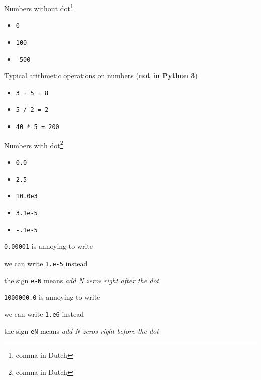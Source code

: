 \documentclass{beamer}
\begin{document}
\begin{slide}{
\item Numbers without dot\footnote{comma in Dutch}
\begin{itemize}
\item \texttt{0}
\item \texttt{100} 
\item \texttt{-500}
\end{itemize}
}\end{slide}

\begin{slide}{
\item Typical arithmetic operations on numbers (\textbf{not in Python 3})
\begin{itemize}
\item \texttt{3 + 5 = 8}
\item \texttt{5 / 2 = 2}
\item \texttt{40 * 5 = 200}
\end{itemize} 
}\end{slide}

\begin{slide}{
\item Numbers with dot\footnote{comma in Dutch}
\begin{itemize}
\item \texttt{0.0}
\item \texttt{2.5}
\item \texttt{10.0e3}
\item \texttt{3.1e-5}
\item \texttt{-.1e-5}
\end{itemize}
}\end{slide}

\begin{slide}{
\item \texttt{0.00001} is annoying to write
\item we can write \texttt{1.e-5} instead
\item the sign \texttt{e-N} means \textit{add N zeros right after the dot}
}\end{slide}

\begin{slide}{
\item \texttt{1000000.0} is annoying to write
\item we can write \texttt{1.e6} instead
\item the sign \texttt{eN} means \textit{add N zeros right before the dot}
}\end{slide}
\end{document}
